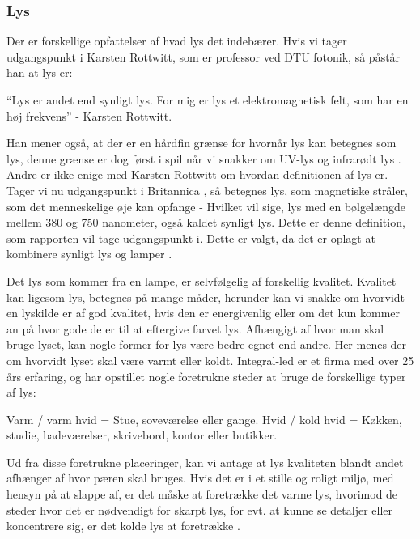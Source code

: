 \subsubsection{Lys}
Der er forskellige opfattelser af hvad lys det indebærer. Hvis vi tager udgangspunkt i Karsten Rottwitt, som er professor ved DTU fotonik, så påstår han at lys er:

“Lys er andet end synligt lys. For mig er lys et elektromagnetisk felt, som har en høj frekvens”
- Karsten Rottwitt.

Han mener også, at der er en hårdfin grænse for hvornår lys kan betegnes som lys, denne grænse er dog først i spil når vi snakker om UV-lys og infrarødt lys \cite{def_lys}. 
Andre er ikke enige med Karsten Rottwitt om hvordan definitionen af lys er. Tager vi nu udgangspunkt i Britannica \cite{britannica_lys}, så betegnes lys, som magnetiske stråler, som det menneskelige øje kan opfange - Hvilket vil sige, lys med en bølgelængde mellem 380 og 750 nanometer, også kaldet synligt lys. 
Dette er denne definition, som rapporten vil tage udgangspunkt i. Dette er valgt, da det er oplagt at kombinere synligt lys og lamper \cite{def_lys}.


Det lys som kommer fra en lampe, er selvfølgelig af forskellig kvalitet. Kvalitet kan ligesom lys, betegnes på mange måder, herunder kan vi snakke om hvorvidt en lyskilde er af god kvalitet, hvis den er energivenlig eller om det kun kommer an på hvor gode de er til at eftergive farvet lys. 
Afhængigt af hvor man skal bruge lyset, kan nogle former for lys være bedre egnet end andre. Her menes der om hvorvidt lyset skal være varmt eller koldt. Integral-led er et firma med over 25 års erfaring, og har opstillet nogle foretrukne steder at bruge de forskellige typer af lys:
\begin{enumerate}
Varm / varm hvid = Stue, soveværelse eller gange.
Hvid / kold hvid = Køkken, studie, badeværelser, skrivebord, kontor eller butikker.
\end{enumerate} 
Ud fra disse foretrukne placeringer, kan vi antage at lys kvaliteten blandt andet afhænger af hvor pæren skal bruges. Hvis det er i et stille og roligt miljø, med hensyn på at slappe af, er det måske at foretrække det varme lys, hvorimod de steder hvor det er nødvendigt for skarpt lys, for evt. at kunne se detaljer eller koncentrere sig, er det kolde lys at foretrække \cite{varm_kold}.

